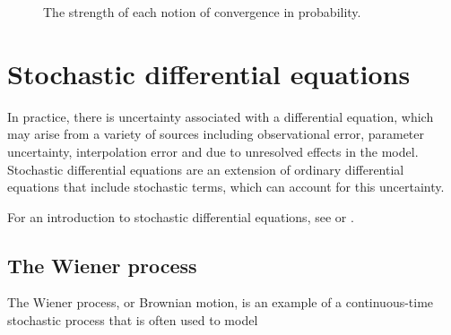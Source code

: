 \usetikzlibrary{positioning}
\begin{figure}
	\begin{center}
		\caption{The strength of each notion of convergence in probability.}
		\label{fig:rv_conv_impl}
	\end{center}
\end{figure}



\section{Stochastic differential equations}
In practice, there is uncertainty associated with a differential equation, which may arise from a variety of sources including observational error, parameter uncertainty, interpolation error and due to unresolved effects in the model.
Stochastic differential equations are an extension of ordinary differential equations that include stochastic terms, which can account for this uncertainty.

For an introduction to stochastic differential equations, see \citet{Oksendal_2003_StochasticDifferentialEquations} or \citet{KallianpurSundar_2014_StochasticAnalysisDiffusion}.


\subsection{The Wiener process}

The Wiener process, or Brownian motion, is an example of a continuous-time stochastic process that is often used to model


